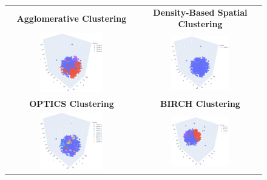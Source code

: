 \begin{figure} 
	\setlength\tabcolsep{3pt}%
	\centering
	\begin{tabular}{|c|c|}
		\hline
		\textbf{Agglomerative Clustering} &
		\textbf{Density-Based Spatial Clustering} \\
		\includegraphics[width=0.5\textwidth]{NOTEBOOK/IMAGENES_CLUSTERING/5_TNSE_Agglomerative_Clustering} &
		\includegraphics[width=0.5\textwidth]{NOTEBOOK/IMAGENES_CLUSTERING/6_TNSE_Density_Based_Spatial_Clustering} 
		\\ \hline
		\textbf{OPTICS Clustering} &
		\textbf{BIRCH Clustering} \\
		\includegraphics[width=0.5\textwidth]{NOTEBOOK/IMAGENES_CLUSTERING/7_TNSE_OPTICS_Clustering} &
		\includegraphics[width=0.5\textwidth]{NOTEBOOK/IMAGENES_CLUSTERING/8_TNSE_Birch_Clustering} 

\end{tabular}
\end{figure}
